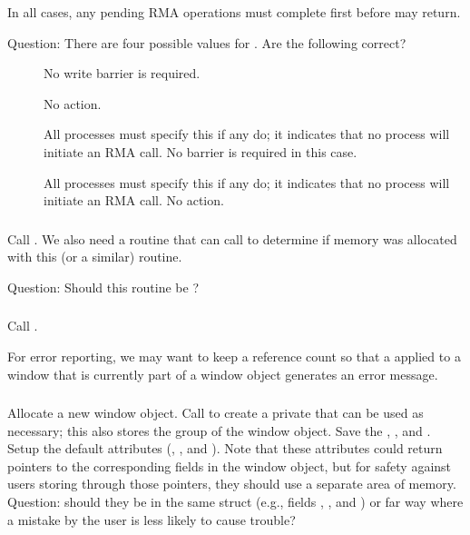 \documentclass{article}
\begin{document}
In all cases, any pending RMA operations must complete first before
 may return.

Question:  There are four possible  values for
.  Are the following correct?
\begin{description}
\item[]No write barrier is required.
\item[]No action.
\item[]All processes must specify this if any do;
  it 
  indicates that no process will initiate an RMA call.  No barrier is required
  in this case.
\item[]All processes must specify this if any do;
  it indicates that no process will initiate an RMA call.  No action.
\end{description}

\subsubsection{}
Call .  We also need a routine that
 can call to determine if memory was allocated with
this (or a similar) routine.

Question: Should this routine be ?

\subsubsection{}
Call .

For error reporting, we may want to keep a reference count so that a
 applied to a window that is currently part of a window
object generates an error message.

\subsubsection{}
Allocate a new window object.  Call  to create a
private  that can be used as necessary; this also stores
the group of the window object.  Save the ,
, and . 
Setup the default attributes (,
, and ).  Note that these
attributes could return pointers to the corresponding fields in the window
object, but for safety against users storing through those pointers, they
should use a separate area of memory.  Question: should they be in the same
struct (e.g., fields , ,
and ) or far way where a mistake by the user is
less likely to cause trouble?
\end{document}
